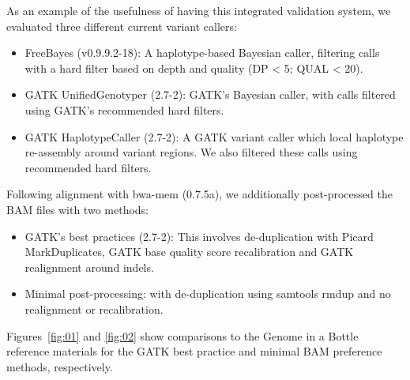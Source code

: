 \documentclass{frontiersSCNS}
\begin{document}
As an example of the usefulness of having this integrated validation system, we
evaluated three different current variant callers:

\begin{itemize}
\item FreeBayes (v0.9.9.2-18): A haplotype-based Bayesian caller, filtering
  calls with a hard filter based on depth and quality (DP < 5; QUAL < 20).

\item GATK UnifiedGenotyper (2.7-2): GATK’s Bayesian caller, with
  calls filtered using GATK's recommended hard filters.

\item GATK HaplotypeCaller (2.7-2): A GATK variant caller which local haplotype
  re-assembly around variant regions. We also filtered these calls using
  recommended hard filters.
\end{itemize}

Following alignment with bwa-mem (0.7.5a), we additionally post-processed
the BAM files with two methods:

\begin{itemize}
\item GATK’s best practices (2.7-2): This involves de-duplication with Picard
  MarkDuplicates, GATK base quality score recalibration and GATK realignment
  around indels.
\item Minimal post-processing: with de-duplication using samtools rmdup and no
  realignment or recalibration.
\end{itemize}

\FloatBarrier

Figures~\ref{fig:01} and \ref{fig:02} show comparisons to the Genome in a Bottle
reference materials for the GATK best practice and minimal BAM preference
methods, respectively.
\end{document}
